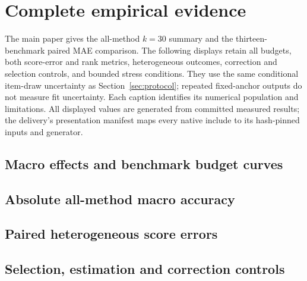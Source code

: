 \section{Complete empirical evidence}\label{app:empirical}
The main paper gives the all-method $k=30$ summary and the thirteen-benchmark paired MAE comparison. The following displays retain all budgets, both score-error and rank metrics, heterogeneous outcomes, correction and selection controls, and bounded stress conditions. They use the same conditional item-draw uncertainty as Section~\ref{sec:protocol}; repeated fixed-anchor outputs do not measure fit uncertainty. Each caption identifies its numerical population and limitations. All displayed values are generated from committed measured results; the delivery's presentation manifest maps every native include to its hash-pinned inputs and generator.

\subsection{Macro effects and benchmark budget curves}
\clearpage
{}
\clearpage
{}
\clearpage
{}
\clearpage
{}
\clearpage
{}
\clearpage
\subsection{Absolute all-method macro accuracy}
\clearpage
{}
\clearpage
{}
\clearpage
{}
\clearpage
\subsection{Paired heterogeneous score errors}
\clearpage
{}
\clearpage
{}
\clearpage
{}
\clearpage
{}
\clearpage
\subsection{Selection, estimation and correction controls}
\clearpage
{}
\clearpage
{}
\clearpage
{}
\clearpage
{}
\clearpage
{}
\clearpage
{}
\clearpage
{}
\clearpage
{}
\clearpage
{}
\clearpage
